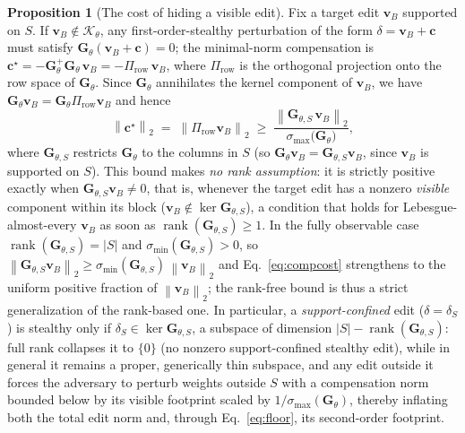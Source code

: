 \documentclass[11pt]{article}
\newcommand{\norm}[1]{\left\lVert #1 \right\rVert}
\theoremstyle{definition}
\newtheorem{proposition}{Proposition}
\begin{document}
\begin{proposition}[The cost of hiding a visible edit]
\label{prop:comp}
Fix a target edit $\bm{v}_B$ supported on $S$. If $\bm{v}_B \notin
\mathcal{K}_\theta$, any first-order-stealthy perturbation of the form
$\delta = \bm{v}_B + \bm{c}$ must satisfy $\bm{G}_\theta(\bm{v}_B + \bm{c}) =
0$; the minimal-norm compensation is $\bm{c}^\star = -\bm{G}_\theta^{+}
\bm{G}_\theta\,\bm{v}_B = -\Pi_{\mathrm{row}}\,\bm{v}_B$, where
$\Pi_{\mathrm{row}}$ is the orthogonal projection onto the row space of
$\bm{G}_\theta$. Since $\bm{G}_\theta$ annihilates the kernel component of
$\bm{v}_B$, we have $\bm{G}_\theta\bm{v}_B =
\bm{G}_\theta\Pi_{\mathrm{row}}\bm{v}_B$ and hence
\begin{equation}
  \norm{\bm{c}^\star}_2
  \;=\; \norm{\Pi_{\mathrm{row}}\bm{v}_B}_2
  \;\ge\; \frac{\norm{\bm{G}_{\theta,S}\,\bm{v}_B}_2}
                 {\sigma_{\max}\!\big(\bm{G}_\theta\big)},
  \label{eq:compcost}
\end{equation}
where $\bm{G}_{\theta,S}$ restricts $\bm{G}_\theta$ to the columns in $S$ (so
$\bm{G}_\theta\bm{v}_B = \bm{G}_{\theta,S}\bm{v}_B$, since $\bm{v}_B$ is
supported on $S$). This bound makes \emph{no rank assumption}: it is
strictly positive exactly when $\bm{G}_{\theta,S}\bm{v}_B \ne 0$, that is,
whenever the target edit has a nonzero \emph{visible} component within its block
($\bm{v}_B \notin \ker \bm{G}_{\theta,S}$), a condition that holds for
Lebesgue-almost-every $\bm{v}_B$ as soon as
$\operatorname{rank}(\bm{G}_{\theta,S}) \ge 1$. In the fully observable case
$\operatorname{rank}(\bm{G}_{\theta,S}) = |S|$ and
$\sigma_{\min}(\bm{G}_{\theta,S}) > 0$, so
$\norm{\bm{G}_{\theta,S}\bm{v}_B}_2 \ge
\sigma_{\min}(\bm{G}_{\theta,S})\,\norm{\bm{v}_B}_2$ and
Eq.~\eqref{eq:compcost} strengthens to the uniform positive fraction of
$\norm{\bm{v}_B}_2$; the rank-free bound is thus a strict generalization of the
rank-based one. In particular, a \emph{support-confined} edit
($\delta = \delta_S$) is stealthy only if $\delta_S \in \ker
\bm{G}_{\theta,S}$, a subspace of dimension $|S| -
\operatorname{rank}(\bm{G}_{\theta,S})$: full rank collapses it to $\{0\}$ (no
nonzero support-confined stealthy edit), while in general it remains a proper,
generically thin subspace, and any edit outside it forces the adversary to
perturb weights outside $S$ with a compensation norm bounded below by its
visible footprint scaled by $1/\sigma_{\max}(\bm{G}_\theta)$, thereby inflating
both the total edit norm and, through Eq.~\eqref{eq:floor}, its second-order
footprint.
\end{proposition}
\end{document}
